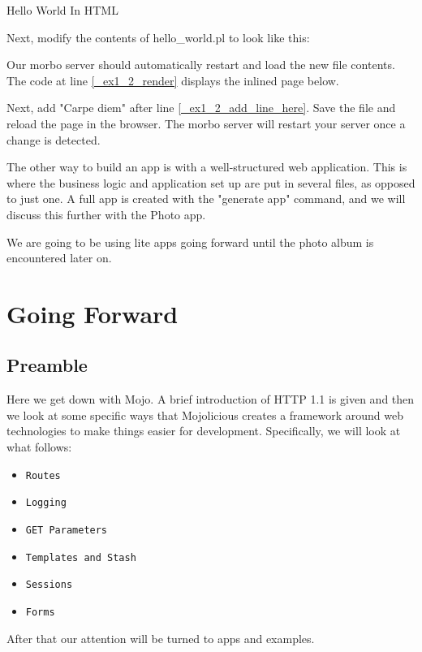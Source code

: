 \documentclass[14pt]{extreport}
\begin{document}
{\Large Hello World In HTML}

Next, modify the contents of hello\_world.pl to look like this:



Our morbo server should automatically restart and load the new file contents.
The code at line \ref{_ex1_2_render} displays the inlined page below.

Next, add "Carpe diem" after line \ref{_ex1_2_add_line_here}. Save the file and
reload the page in the browser. The morbo server will restart your server once
a change is detected.

The other way to build an app is with a well-structured web application. This
is where the business logic and application set up are put in several files, as
opposed to just one.  A full app is created with the "generate app" command,
and we will discuss this further with the Photo app.

We are going to be using lite apps going forward until the photo album is
encountered later on.

\chapter*{Going Forward}

\section{Preamble}

Here we get down with Mojo.  A brief introduction of HTTP 1.1 is given and then
we look at some specific ways that Mojolicious creates a framework around
web technologies to make things easier for development.  Specifically, we will look
at what follows:

\begin{itemize} \itemsep1pt \parskip0pt 
\item \verb|Routes|
\item \verb|Logging|
\item \verb|GET Parameters|
\item \verb|Templates and Stash|
\item \verb|Sessions|
\item \verb|Forms|
\end{itemize}

After that our attention will be turned to apps and examples.
\end{document}
